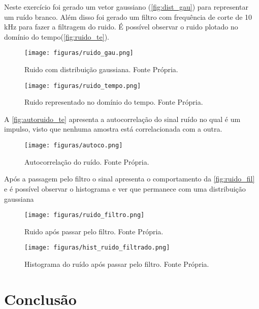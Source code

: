\documentclass[11pt]{classes/ifscarticle}
\begin{document}
Neste exercício foi gerado um vetor gaussiano (\autoref{fig:dist_gau}) para representar um ruído branco. Além disso foi gerado um filtro com frequência de corte de 10 kHz para fazer a filtragem do ruido.
É possível observar o ruido plotado no domínio do tempo(\autoref{fig:ruido_te}). 

\begin{figure}[ht]
    \centering
    \texttt{[image: figuras/ruido\_gau.png]}
    \caption{Ruido com distribuição gaussiana. Fonte Própria.}
    \label{fig:dist_gau}
\end{figure}

\begin{figure}[ht]
    \centering
    \texttt{[image: figuras/ruido\_tempo.png]}
    \caption{Ruido representado no domínio do tempo. Fonte Própria.}
    \label{fig:ruido_te}
\end{figure}

A \autoref{fig:autoruido_te} apresenta a autocorrelação do sinal ruído no qual é um impulso, visto que nenhuma amostra está correlacionada com a outra.

\begin{figure}[ht]
    \centering
    \texttt{[image: figuras/autoco.png]}
    \caption{Autocorrelação do ruído. Fonte Própria.}
    \label{fig:autoruido_te}
\end{figure}

\newpage

Após a passagem pelo filtro o sinal apresenta o comportamento da \autoref{fig:ruido_fil} e é possível observar o histograma e ver que permanece com uma distribuição gaussiana

\begin{figure}[ht]
    \centering
    \texttt{[image: figuras/ruido\_filtro.png]}
    \caption{Ruido após passar pelo filtro. Fonte Própria.}
    \label{fig:ruido_fil}
\end{figure}

\begin{figure}[ht]
    \centering
    \texttt{[image: figuras/hist\_ruido\_filtrado.png]}
    \caption{Histograma do ruído após passar pelo filtro. Fonte Própria.}
    \label{fig:hist_ruido}
\end{figure}

\section{Conclusão}
\label{sec:conclusão}
\end{document}
